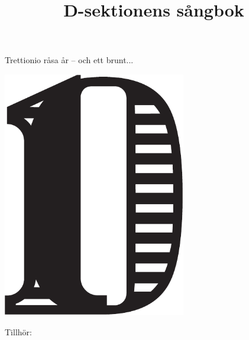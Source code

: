 \documentclass{article}
\title{\fontsize{20}{20} \selectfont D-sektionens sångbok \vspace{-40pt}}
\author{}
\date{}
\begin{document}
\thispagestyle{empty}
\maketitle
\thispagestyle{empty} %

\begin{center}
Trettionio råsa år -- och ett brunt...
\end{center}
\vspace{1mm} %

\begin{center}
   \includegraphics[width=0.6\textwidth]{res/D-symbol.pdf}
\end{center}

\newpage
Tillhör:
\newpage
\thispagestyle{plain}
\tableofcontents
\newpage







\null
\newpage





\null
\newpage



\null
\newpage


\end{document}
